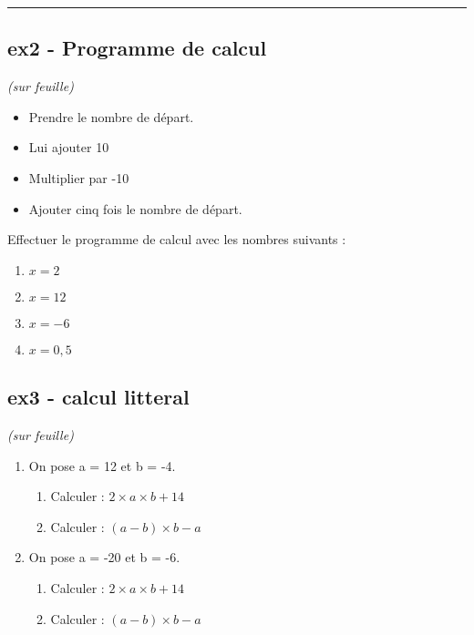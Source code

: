 \documentclass[11pt]{article}
\newcommand{\horrule}[1]{\rule{\linewidth}{#1}} %
\begin{document}
\vspace{-0.4cm}
\horrule{1px}
\vspace{-0.8cm}

\begin{multicols}{2}

  \subsection*{ex2 - Programme de calcul}

  \textit{(sur feuille)}
  \begin{itemize}
  \item Prendre le nombre de départ.
  \item Lui ajouter 10
  \item Multiplier par -10 
  \item Ajouter cinq fois le nombre de départ. 
  \end{itemize}

  Effectuer le programme de calcul avec les nombres suivants :

  \begin{multicols}{2}

    \begin{enumerate}
    \item $x = 2$
    \item $x = 12$
    \item $x = -6$
    \item $x = 0,5$
    \end{enumerate}

  \end{multicols}

  \subsection*{ex3 - calcul litteral}

  \textit{(sur feuille)}
  \begin{enumerate}
  \item On pose a = 12 et b = -4.
    \begin{enumerate}
    \item Calculer : $2 \times a \times b + 14$
    \item Calculer : $(a - b)\times b - a$
    \end{enumerate}

  \item On pose a = -20 et b = -6.
    \begin{enumerate}
    \item Calculer : $2 \times a \times b + 14$
    \item Calculer : $(a - b)\times b - a$
    \end{enumerate}
  \end{enumerate}

\end{multicols}
\end{document}
